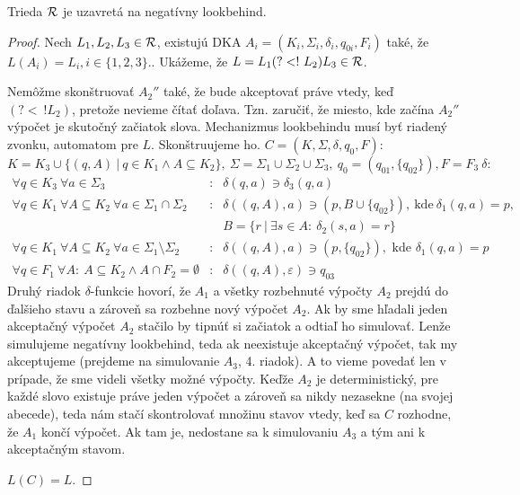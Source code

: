 \begin{lema}
Trieda ${\cal R}$ je uzavretá na negatívny lookbehind.
\end{lema}
\begin{proof}
Nech $L_1,L_2,L_3 \in {\cal R}$, existujú DKA $ A_{i} = (K_{i},\Sigma_{i},\delta_{i},q_{0i},F_{i}) $ také, že $ L(A_{i})=L_{i}, i \in \lbrace 1,2,3\rbrace $.. Ukážeme, že $L=L_1(?<!~L_2)L_3 \in {\cal R}$.

Nemôžme skonštruovať $A_2''$ také, že bude akceptovať práve vte\-dy, keď $(?<~!L_2)$, pretože nevieme čítať doľava. Tzn. zaručiť, že miesto, kde začína $A_2''$ výpočet je skutočný začiatok slova. Mechanizmus lookbehindu musí byť riadený zvonku, automatom pre $L$. Skonštruujeme ho. $C=(K,\Sigma, \delta,q_0,F):$ 
$$K=K_3\cup \lbrace (q,A) ~|~ q \in K_1 \wedge A \subseteq K_2 \rbrace,~\Sigma = \Sigma_1\cup\Sigma_2\cup\Sigma_3,~q_0=(q_{01},\lbrace q_{02}\rbrace),F=F_3~ \delta:$$
\begin{eqnarray*}
\forall q \in K_3~ \forall a \in \Sigma_3 &:& \delta(q,a) \ni \delta_3(q,a) \\
\forall q \in K_1 ~\forall A \subseteq K_2~ \forall a \in \Sigma_1 \cap \Sigma_2 &:& \delta((q,A),a) \ni (p,B\cup \lbrace q_{02}\rbrace), ~\text{kde}~ \delta_1(q,a)=p,\\ &~& B=\lbrace r ~|~ \exists s \in A:~ \delta_2(s,a)=r \rbrace \\
\forall q \in K_1 ~\forall A \subseteq K_2 ~ \forall a \in \Sigma_1 \setminus \Sigma_2 &:& \delta((q,A),a) \ni (p,\lbrace q_{02}\rbrace), \text{ kde } \delta_1(q,a)=p \\
\forall q \in F_1~\forall A: ~A \subseteq K_2 \wedge A \cap F_2 = \emptyset &:& \delta((q,A),\varepsilon) \ni q_{03}
\end{eqnarray*}
Druhý riadok $\delta$-funkcie hovorí, že $A_1$ a všetky rozbehnuté výpočty $A_2$ prejdú do ďalšieho stavu a zároveň sa rozbehne nový výpočet $A_2$. Ak by sme hľadali jeden akceptačný výpočet $A_2$ stačilo by tipnúť si začiatok a odtiaľ ho simulovať. Lenže simulujeme negatívny lookbehind, teda ak neexistuje akceptačný výpočet, tak my akceptujeme (prejdeme na simulovanie $A_3$, 4. riadok). A to vieme povedať len v prípade, že sme videli všetky možné výpočty. Keďže $A_2$ je deterministický, pre každé slovo existuje práve jeden výpočet a zároveň sa nikdy nezasekne (na svojej abecede), teda nám stačí skontrolovať množinu stavov vtedy, keď sa $C$ rozhodne, že $A_1$ končí výpočet. Ak tam je, nedostane sa k simulovaniu $A_3$ a tým ani k akceptačným stavom.

$L(C)=L.$


\end{proof}
